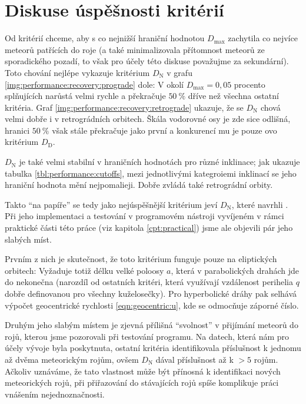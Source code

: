 \section{Diskuse úspěšnosti kritérií}%
Od kritérií chceme, aby s co nejnižší hraniční hodnotou $D_\text{max}$ zachytila co nejvíce meteorů patřících do roje (a také minimalizovala přítomnost meteorů ze sporadického pozadí, to však pro účely této diskuse považujme za sekundární). Toto chování nejlépe vykazuje kritérium $D_\text{N}$ v grafu \ref{img:performance:recovery:prograde} dole: V okolí $D_\text{max}=0{,}05$ procento splňujících narůstá velmi rychle a překračuje $50\:\%$ dříve než všechna ostatní kritéria. Graf \ref{img:performance:recovery:retrograde} ukazuje, že se $D_\text{N}$ chová velmi dobře i v retrográdních orbitech. Škála vodorovné osy je zde sice odlišná, hranici $50\:\%$ však stále překračuje jako první a konkurencí mu je pouze \citeauthor{cometassoc}ovo kritérium $D_\text{D}$.

$D_\text{N}$ je také velmi stabilní v hraničních hodnotách pro různé inklinace; jak ukazuje tabulka \ref{tbl:performance:cutoffs}, mezi jednotlivými kategroiemi inklinací se jeho hraniční hodnota mění nejpomalieji. Dobře zvládá také retrográdní orbity.

\smallskip

Takto "`na papíře"' se tedy jako nejúspěšnější kritérium jeví $D_\text{N}$, které navrhli \citeauthor{newapproach}. Při jeho implementaci a testování v programovém nástroji vyvíjeném v rámci praktické části této práce (viz kapitola \ref{cpt:practical}) jsme ale objevili pár jeho slabých míst.

Prvním z nich je skutečnost, že toto kritérium funguje pouze na eliptických orbitech: Vyžaduje totiž délku velké poloosy $a$, která v parabolických drahách jde do nekonečna (narozdíl od ostatních kritéri, která využívají vzdálenost perihelia $q$ dobře definovanou pro všechny kuželosečky). Pro hyperbolické dráhy pak selhává výpočet geocentrické rychlosti \eqref{eqn:geocentric:u}, kde se odmocňuje záporné číslo.

Druhým jeho slabým místem je zjevná přílišná "`svolnost"' v přijímání meteorů do rojů, kterou jsme pozorovali při testování programu. Na datech, která nám pro účely vývoje byla poskytnuta, ostatní kritéria identifikovala příslušnost k jednomu až dvěma meteorickým rojům, ovšem $D_\text{N}$ dával příslušnost až k $>5$ rojům. Ačkoliv uznáváme, že tato vlastnost může být přínosná k identifikaci nových meteorických rojů, při přiřazování do stávajících rojů spíše komplikuje práci vnášením nejednoznačnosti.

